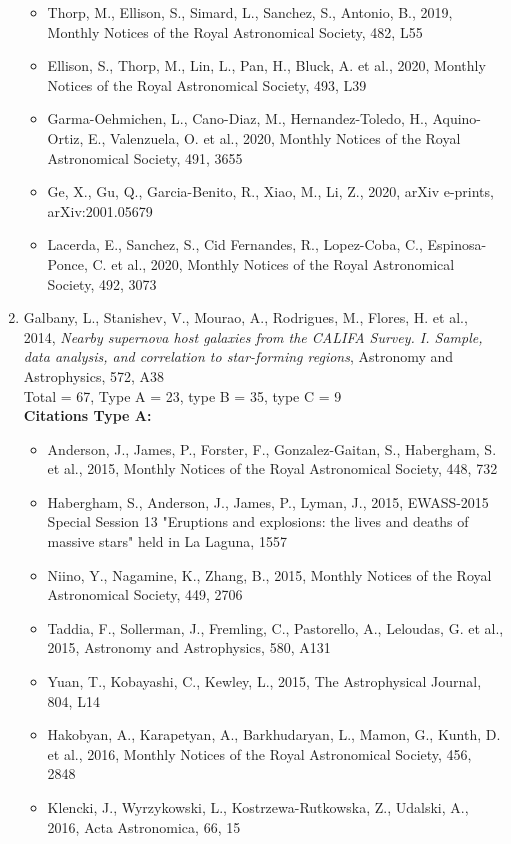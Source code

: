 \documentclass{letter}
\begin{document}
\begin{enumerate}
\begin{itemize}
\item Thorp, M., Ellison, S., Simard, L., Sanchez, S., Antonio, B., 2019, Monthly Notices of the Royal Astronomical Society, 482, L55
\item Ellison, S., Thorp, M., Lin, L., Pan, H., Bluck, A. et al., 2020, Monthly Notices of the Royal Astronomical Society, 493, L39
\item Garma-Oehmichen, L., Cano-Diaz, M., Hernandez-Toledo, H., Aquino-Ortiz, E., Valenzuela, O. et al., 2020, Monthly Notices of the Royal Astronomical Society, 491, 3655
\item Ge, X., Gu, Q., Garcia-Benito, R., Xiao, M., Li, Z., 2020, arXiv e-prints, arXiv:2001.05679
\item Lacerda, E., Sanchez, S., Cid Fernandes, R., Lopez-Coba, C., Espinosa-Ponce, C. et al., 2020, Monthly Notices of the Royal Astronomical Society, 492, 3073
\end{itemize}
\item Galbany, L., Stanishev, V., Mourao, A., Rodrigues, M., Flores, H. et al., 2014, {\it Nearby supernova host galaxies from the CALIFA Survey. I. Sample, data analysis, and correlation to star-forming regions}, Astronomy and Astrophysics, 572, A38 \\ 
Total = 67, Type A = 23, type B = 35, type C = 9 \\ 
{\bf Citations Type A:}
\begin{itemize}
\item Anderson, J., James, P., Forster, F., Gonzalez-Gaitan, S., Habergham, S. et al., 2015, Monthly Notices of the Royal Astronomical Society, 448, 732
\item Habergham, S., Anderson, J., James, P., Lyman, J., 2015, EWASS-2015 Special Session 13 "Eruptions and explosions: the lives and deaths of massive stars" held in La Laguna, 1557
\item Niino, Y., Nagamine, K., Zhang, B., 2015, Monthly Notices of the Royal Astronomical Society, 449, 2706
\item Taddia, F., Sollerman, J., Fremling, C., Pastorello, A., Leloudas, G. et al., 2015, Astronomy and Astrophysics, 580, A131
\item Yuan, T., Kobayashi, C., Kewley, L., 2015, The Astrophysical Journal, 804, L14
\item Hakobyan, A., Karapetyan, A., Barkhudaryan, L., Mamon, G., Kunth, D. et al., 2016, Monthly Notices of the Royal Astronomical Society, 456, 2848
\item Klencki, J., Wyrzykowski, L., Kostrzewa-Rutkowska, Z., Udalski, A., 2016, Acta Astronomica, 66, 15

\end{itemize}
\end{enumerate}
\end{document}
